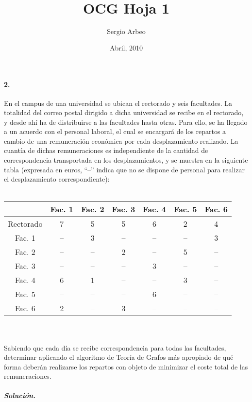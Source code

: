 \documentclass[12pt, oneside, a4paper]{article}
\begin{document}
\title{OCG Hoja 1}\author{Sergio Arbeo}\date{Abril, 2010}\maketitle
\paragraph{2.}\label{ssub:1_} %
En el campus de una universidad se ubican el rectorado y seis
facultades. La totalidad del correo postal dirigido a dicha
universidad se recibe en el rectorado, y desde ahí ha de distribuirse
a las facultades hasta otras. Para ello, se ha llegado a un acuerdo
con el personal laboral, el cual se encargará de los repartos a cambio
de una remuneración económica por cada desplazamiento realizado. La
cuantía de dichas remuneraciones es independiente de la cantidad de
correspondencia transportada en los desplazamientos, y se muestra en
la siguiente tabla (expresada en euros, ``--'' indica que no se
dispone de personal para realizar el desplazamiento correspondiente):
\\
\\

\begin{tabular}{| c | c | c | c | c | c | c | }
\hline
          & Fac. 1 & Fac. 2 & Fac. 3 & Fac. 4 & Fac. 5 & Fac. 6\\
\hline
Rectorado &   7    &   5    &   5    &   6    &   2    &   4   \\ 
\hline
Fac. 1    &  --    &   3    &  --    &  --    &  --    &   3   \\
\hline
Fac. 2    &  --    &  --    &   2    &  --    &   5    &  --   \\
\hline
Fac. 3    &  --    &  --    &  --    &   3    &  --    &  --   \\
\hline
Fac. 4    &   6    &   1    &  --    &  --    &   3    &  --   \\
\hline
Fac. 5    &  --    &  --    &  --    &   6    &  --    &  --   \\
\hline
Fac. 6    &   2    &  --    &   3    &  --    &  --    &  --   \\
\hline
\end{tabular}
\\
\\

Sabiendo que cada día se recibe correspondencia para todas las
facultades, determinar aplicando el algoritmo de Teoría de Grafos más
apropiado de qué forma deberán realizarse los repartos con objeto de
minimizar el coste total de las remuneraciones.


\subparagraph{Solución.\\}
\end{document}
